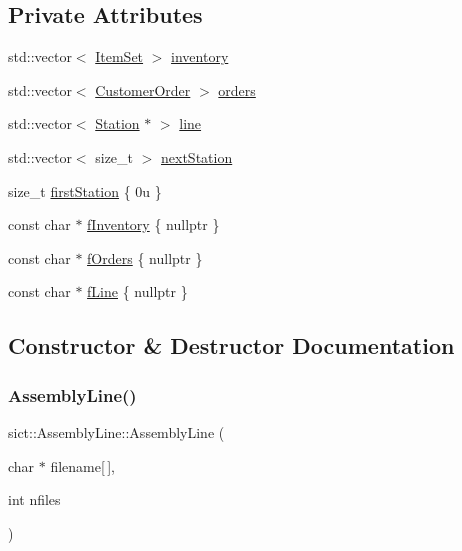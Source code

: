 \subsection*{Private Attributes}
\begin{DoxyCompactItemize}
\item 
std\+::vector$<$ \mbox{\hyperlink{classsict_1_1ItemSet}{Item\+Set}} $>$ \mbox{\hyperlink{classsict_1_1AssemblyLine_a482a0be07bd3d66ad42d4ec7ae8f9af5}{inventory}}
\item 
std\+::vector$<$ \mbox{\hyperlink{classsict_1_1CustomerOrder}{Customer\+Order}} $>$ \mbox{\hyperlink{classsict_1_1AssemblyLine_a45c7d3f30a5d67fd3259786d3e7ca676}{orders}}
\item 
std\+::vector$<$ \mbox{\hyperlink{classsict_1_1Station}{Station}} $\ast$ $>$ \mbox{\hyperlink{classsict_1_1AssemblyLine_ac65838e99087cdd0df9d172eb6b2746b}{line}}
\item 
std\+::vector$<$ size\+\_\+t $>$ \mbox{\hyperlink{classsict_1_1AssemblyLine_a6e8ed8ddd4f3937fa0999fe632c3e755}{next\+Station}}
\item 
size\+\_\+t \mbox{\hyperlink{classsict_1_1AssemblyLine_a8672ba6fbf42ecaa6fad075369c57c25}{first\+Station}} \{ 0u \}
\item 
const char $\ast$ \mbox{\hyperlink{classsict_1_1AssemblyLine_abec155f7589eac1213d0cc980887e8ed}{f\+Inventory}} \{ nullptr \}
\item 
const char $\ast$ \mbox{\hyperlink{classsict_1_1AssemblyLine_a11b6bd4f8bb535f5a8caf57d45d9c6d1}{f\+Orders}} \{ nullptr \}
\item 
const char $\ast$ \mbox{\hyperlink{classsict_1_1AssemblyLine_a67bfb258955a9e661025f7ad1a6754a7}{f\+Line}} \{ nullptr \}
\end{DoxyCompactItemize}


\subsection{Constructor \& Destructor Documentation}
\mbox{\label{classsict_1_1AssemblyLine_a4474cdbd038302bff4c2156378885b1e}} 
\subsubsection{\texorpdfstring{AssemblyLine()}{AssemblyLine()}}
{\footnotesize\ttfamily sict\+::\+Assembly\+Line\+::\+Assembly\+Line (\begin{DoxyParamCaption}\item[{char $\ast$}]{filename\mbox{[}$\,$\mbox{]},  }\item[{int}]{nfiles }\end{DoxyParamCaption})}



